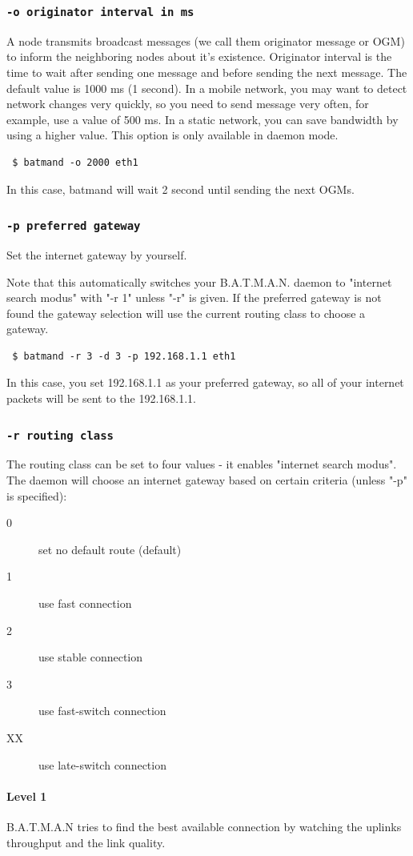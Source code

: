 \documentclass[
	12pt,
	a4paper,
	twoside,
	english,
	headsepline,
	footnosepline,
	automark,
	normalheadings,
	openany,
	cleardoubleplain,
	abstracton,
	idxtotoc,
	liststotoc,
	bibtotoc,
 	BCOR8mm,
]{scrartcl}
\newcommand{\subsubsectionttt}[1]{\subsubsection{\texttt{#1}}}
\begin{document}
\subsubsectionttt{-o originator interval in ms}
A node transmits broadcast messages (we call them originator message or OGM) to
inform the neighboring nodes about it’s existence. Originator interval is the
time to wait after sending one message and before sending the next message.
The default value is 1000 ms (1 second). In a mobile network, you may want to
detect network changes very quickly, so you need to send message very often, for
example, use a value of 500 ms. In a static network, you can save bandwidth by
using a higher value. This option is only available in daemon mode.
\begin{verbatim}
 $ batmand -o 2000 eth1
\end{verbatim}
In this case, batmand will wait 2 second until sending the next OGMs.

\subsubsectionttt{-p preferred gateway}
Set the internet gateway by yourself. 

Note that this automatically switches your B.A.T.M.A.N. daemon to "internet
search modus" with "-r 1" unless "-r" is given. If the preferred gateway is not
found the gateway selection will use the current routing class to choose a
gateway.

\begin{verbatim}
 $ batmand -r 3 -d 3 -p 192.168.1.1 eth1
\end{verbatim}
In this case, you set 192.168.1.1 as your preferred gateway, so all of your
internet packets will be sent to the 192.168.1.1.

\subsubsectionttt{-r routing class}
The routing class can be set to four values - it enables "internet search
modus". The daemon will choose an internet gateway based on certain criteria
(unless "-p" is specified):
\begin{description}
\item[0] set no default route (default)
\item[1] use fast connection
\item[2] use stable connection
\item[3] use fast-switch connection
\item[XX] use late-switch connection
\end{description}

\paragraph*{Level 1}
B.A.T.M.A.N tries to find the best available connection by watching the uplinks
throughput and the link quality.
\end{document}
